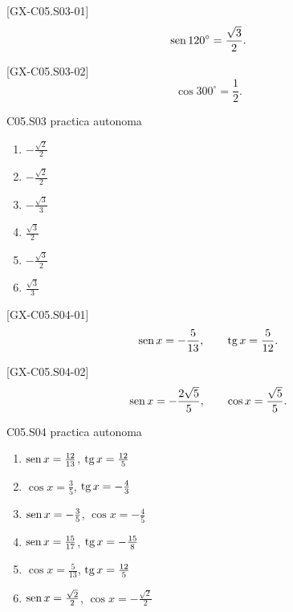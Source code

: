 \begin{shortanswer}{[GX-C05.S03-01]}
\[
\operatorname{sen} 120^\circ=\frac{\sqrt{3}}{2}.
\]
\end{shortanswer}

\begin{shortanswer}{[GX-C05.S03-02]}
\[
\cos 300^\circ=\frac{1}{2}.
\]
\end{shortanswer}

\begin{shortanswer}{C05.S03 practica autonoma}
\begin{enumerate}[label=\textbf{PX-C05.S03-\arabic*:}, leftmargin=*]
  \item \(-\frac{\sqrt{2}}{2}\)
  \item \(-\frac{\sqrt{2}}{2}\)
  \item \(-\frac{\sqrt{3}}{3}\)
  \item \(\frac{\sqrt{3}}{2}\)
  \item \(-\frac{\sqrt{3}}{2}\)
  \item \(\frac{\sqrt{3}}{3}\)
\end{enumerate}
\end{shortanswer}

\begin{shortanswer}{[GX-C05.S04-01]}
\[
\operatorname{sen} x=-\frac{5}{13},
\qquad
\operatorname{tg} x=\frac{5}{12}.
\]
\end{shortanswer}

\begin{shortanswer}{[GX-C05.S04-02]}
\[
\operatorname{sen} x=-\frac{2\sqrt{5}}{5},
\qquad
\cos x=\frac{\sqrt{5}}{5}.
\]
\end{shortanswer}

\begin{shortanswer}{C05.S04 practica autonoma}
\begin{enumerate}[label=\textbf{PX-C05.S04-\arabic*:}, leftmargin=*]
  \item \(\operatorname{sen} x=\frac{12}{13}\), \(\operatorname{tg} x=\frac{12}{5}\)
  \item \(\cos x=\frac{3}{5}\), \(\operatorname{tg} x=-\frac{4}{3}\)
  \item \(\operatorname{sen} x=-\frac{3}{5}\), \(\cos x=-\frac{4}{5}\)
  \item \(\operatorname{sen} x=\frac{15}{17}\), \(\operatorname{tg} x=-\frac{15}{8}\)
  \item \(\cos x=\frac{5}{13}\), \(\operatorname{tg} x=\frac{12}{5}\)
  \item \(\operatorname{sen} x=\frac{\sqrt{2}}{2}\), \(\cos x=-\frac{\sqrt{2}}{2}\)
\end{enumerate}
\end{shortanswer}

